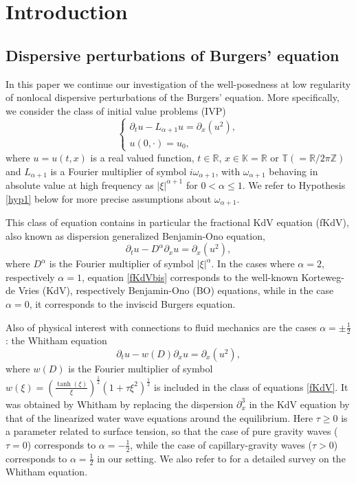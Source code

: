 \documentclass{amsart}
\theoremstyle{definition}
\theoremstyle{remark}
\def\R{{\mathbb R}}
\def\K{{\mathbb K}}
\newcommand{\T}{\mathbb{T}}
\newcommand{\Z}{\mathbb{Z}}
\numberwithin{equation}{section}
\begin{document}
%
%
\section{Introduction}

\subsection{Dispersive perturbations of Burgers' equation}
In this paper we continue our investigation of the well-posedness at low regularity of nonlocal dispersive perturbations of the Burgers' equation. More specifically, we consider the class of initial value problems (IVP)
\begin{equation}\label{fKdV}
 \begin{cases} 
 \partial_tu -L_{\alpha+1}u = \partial_x(u^2), \\ 
 u(0,\cdot)=u_0,
 \end{cases}
\end{equation}
where $u=u(t,x)$ is a real valued function, $t \in \mathbb R$, $x\in \K=\R$ or $\T(=\R/2\pi \Z)$ and $L_{\alpha+1}$ is a Fourier multiplier of symbol $i\omega_{\alpha+1}$, with $\omega_{\alpha+1}$ behaving in absolute value at high frequency as $|\xi|^{\alpha+1}$ for $0<\alpha \le 1$. We refer to Hypothesis \ref{hyp1} below for more precise assumptions about $\omega_{\alpha+1}$. 

This class of equation contains in particular the fractional KdV equation (fKdV), also known as dispersion generalized Benjamin-Ono equation, 
\begin{equation} \label{fKdVbis}
\partial_tu -D^{\alpha}\partial_xu = \partial_x(u^2) ,
\end{equation}
where $D^\alpha$ is the Fourier multiplier of symbol $|\xi|^{\alpha}$.
In the cases where $\alpha=2$, respectively $\alpha=1$, equation \eqref{fKdVbis} corresponds to the well-known Korteweg-de Vries (KdV), respectively Benjamin-Ono (BO) equations, while in the case $\alpha=0$, it corresponds to the inviscid Burgers equation. 

Also of physical interest with connections to fluid mechanics are the cases $\alpha=\pm \frac12$: the Whitham equation 
\begin{equation} \label{Whitham}
\partial_tu -w(D)\partial_xu = \partial_x(u^2) ,
\end{equation}
where $w(D)$ is the Fourier multiplier of symbol $w(\xi)= \left( \frac{\tanh (\xi)}{\xi}\right)^{\frac12} (1+\tau \xi^2)^{\frac12}$ is included in the class of equations \eqref{fKdV}. It was obtained by Whitham \cite{Whitham67} by replacing the dispersion $\partial_x^3$ in the KdV equation by that of the linearized water wave equations around the equilibrium. Here $\tau \ge 0$ is a parameter related to surface tension, so that the case of pure gravity waves ($\tau=0$) corresponds to $\alpha=-\frac12$, while the case of capillary-gravity waves ($\tau>0$) corresponds to $\alpha=\frac12$ in our setting. We also refer to \cite{KLPS18} for a detailed survey on the Whitham equation.
\end{document}

